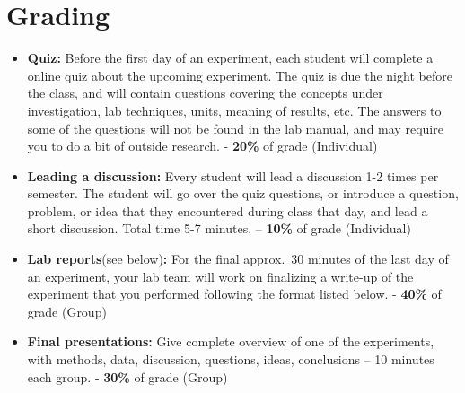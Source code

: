 \newpage

\section*{Grading}
\begin{itemize}
\itemsep0em
\item \textbf{Quiz:}  Before the first day of an experiment, each student will complete a online quiz about the upcoming experiment. The quiz is due the night before the class, and will contain questions covering the concepts under investigation, lab techniques, units, meaning of results, etc. The answers to some of the questions will not be found in the lab manual, and may require you to do a bit of outside research. \newline - \textbf{20\%} of grade (Individual)
\item \textbf{Leading a discussion:} Every student will lead a discussion 1-2 times per semester. The student will go over the quiz questions, or introduce a question, problem, or idea that they encountered during class that day, and lead a short discussion. Total time 5-7 minutes. \newline – \textbf{10\%} of grade (Individual)
\item \textbf{Lab reports}(see below)\textbf{:} For the final approx.\ 30 minutes of the last day of an experiment, your lab team will work on finalizing a write-up of the experiment that you performed following the format listed below. \newline - \textbf{40\%} of grade (Group)
\item \textbf{Final presentations:} Give complete overview of one of the experiments, with methods, data, discussion, questions, ideas, conclusions – 10 minutes each group. \newline - \textbf{30\%} of grade (Group)
\end{itemize}

